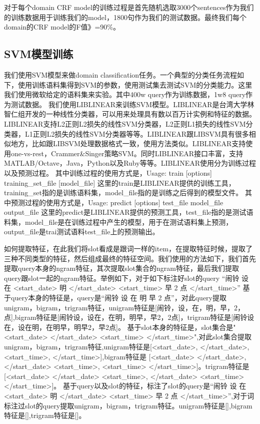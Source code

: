 \documentclass[master]{njuthesis}
\begin{document}
    对于每个domain CRF model的训练过程是首先随机选取3000个sentences作为我们的训练数据用于训练我们的model，1800句作为我们的测试数据。最终我们每个domain的CRF model的F值》=90\%。
\subsection{SVM模型训练}
    
    我们使用SVM模型来做domain classification任务。一个典型的分类任务流程如下，使用训练语料集得到SVM的参数，使用测试集去测试SVM的分类能力。这里我们使用微软给定的语料集来实验。其中400w query作为训练数据，1w8 query作为测试数据。
   我们使用LIBLINEAR来训练SVM模型。LIBLINEAR是台湾大学林智仁组开发的一种线性分类器，可以用来处理具有数以百万计实例和特征的数据。LIBLINEAR支持L2正则L2损失的线性SVM分类器，L2正则L1损失的线性SVM分类器，L1正则L2损失的线性SVM分类器等等。LIBLINEAR跟LIBSVM具有很多相似地方，比如跟LIBSVM处理数据格式一致，使用方法类似。LIBLINEAR支持使用one-vs-rest，Crammer\&Singer策略SVM。同时LIBLINEAR接口丰富，支持MATLAB/Octave，Java，Python以及Ruby等等。LIBLINEAR使用分为训练过程以及预测过程。
    其中训练过程的使用方式是，Usage: train [options] training\_set\_file [model\_file]
   这里的train是LIBLINEAR提供的训练工具，training\_set指的是训练语料集，model\_file指的是训练之后得到的模型文件。
    其中预测过程的使用方式是，Usage: predict [options] test\_file model\_file output\_file
   这里的predict是LIBLINEAR提供的预测工具，test\_file指的是测试语料集，model\_file是在训练过程中产生的模型，用于在测试语料集上预测，output\_file是trai测试语料test\_file上的预测输出。

    如何提取特征，在此我们将slot看成是跟词一样的item，在提取特征时候，提取了三种不同类型的特征，然后组成最终的特征空间。我们使用的方法如下，我们首先提取query本身的ngram特征，其次提取slot集合的ngram特征，最后我们提取query跟slot一起的ngram特征。举例如下，对于如下标注好slot的query
“闹铃 设 在 <start\_date> 明 </start\_date> <start\_time>  早 2 点 </start\_time>”
    基于query本身的特征是，query是“闹铃 设 在 明 早 2 点”，对此query提取unigram，bigram，trigram特征，unigram特征是[闹铃，设，在，明，早，2，点],bigram特征是[闹铃设，设在，在明，明早，早2，2点]，trigram特征是[闹铃设在，设在明，在明早，明早2，早2点]。
    基于slot本身的特征是，slot集合是"<start\_date> </start\_date> <start\_time> </start\_time>",对此slot集合提取unigram，bigram，trigram特征,unigram特征是[<start\_date>, </start\_date>, <start\_time>, </start\_time>],bigram特征是
[<start\_date> </start\_date>, </start\_date> <start\_time>, <start\_time> </start\_time>]。trigram特征是[<start\_date> </start\_date> <start\_time>, </start\_date> <start\_time> </start\_time>]。
    基于query以及slot的特征，标注了slot的query是“闹铃 设 在 <start\_date> 明 </start\_date> <start\_time> 早 2 点 </start\_time>”,对于词标注过slot的query提取unigram，bigram，trigram特征。unigram特征是[],bigram特征是[],trigram特征是[]。
\end{document}
